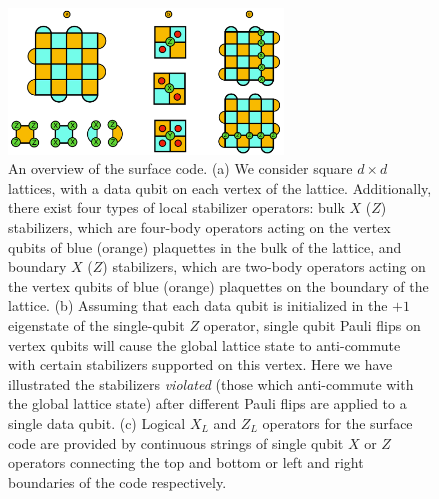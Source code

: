 \documentclass[onecolumn,preprintnumbers,amsmath,amssymb,notitlepage,nofootinbib,longbibliography,superscriptaddress,aps,pra,10pt]{revtex4-1}
\begin{document}
      \begin{figure}
      \centering
          \includegraphics[width=0.65\textwidth]{surface_code.pdf}
      \caption{An overview of the surface code. (a) We consider square $d\times d$ lattices, with a data qubit on each vertex of the lattice. Additionally, there exist four types of local stabilizer operators: bulk $X$ ($Z$) stabilizers, which are four-body operators acting on the vertex qubits of blue (orange) plaquettes in the bulk of the lattice, and boundary $X$ ($Z$) stabilizers, which are two-body operators acting on the vertex qubits of blue (orange) plaquettes on the boundary of the lattice. (b) Assuming that each data qubit is initialized in the $+1$ eigenstate of the single-qubit $Z$ operator, single qubit Pauli flips on vertex qubits will cause the global lattice state to anti-commute with certain stabilizers supported on this vertex. Here we have illustrated the stabilizers \textit{violated} (those which anti-commute with the global lattice state) after different Pauli flips are applied to a single data qubit. (c) Logical $X_L$ and $Z_L$ operators for the surface code are provided by continuous strings of single qubit $X$ or $Z$ operators connecting the top and bottom or left and right boundaries of the code respectively.}\label{f:surface_code}
    \end{figure}
\end{document}

